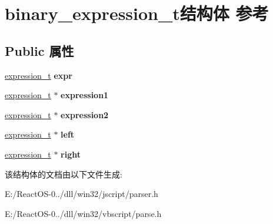\hypertarget{structbinary__expression__t}{}\section{binary\+\_\+expression\+\_\+t结构体 参考}
\label{structbinary__expression__t}
\subsection*{Public 属性}
\begin{DoxyCompactItemize}
\item 
\mbox{\label{structbinary__expression__t_a37b4bea766c22ebcfaf665cd6819bd66}} 
\hyperlink{struct__expression__t}{expression\+\_\+t} {\bfseries expr}
\item 
\mbox{\label{structbinary__expression__t_a7575e5584618b599ffcb671cf500068d}} 
\hyperlink{struct__expression__t}{expression\+\_\+t} $\ast$ {\bfseries expression1}
\item 
\mbox{\label{structbinary__expression__t_ade2a074801ab798f55ffe17bfb4d5f59}} 
\hyperlink{struct__expression__t}{expression\+\_\+t} $\ast$ {\bfseries expression2}
\item 
\mbox{\label{structbinary__expression__t_a068ad7e4fea53c4b6e3261a70338dd1a}} 
\hyperlink{struct__expression__t}{expression\+\_\+t} $\ast$ {\bfseries left}
\item 
\mbox{\label{structbinary__expression__t_af40a00f93863ff0973614dcc9078402f}} 
\hyperlink{struct__expression__t}{expression\+\_\+t} $\ast$ {\bfseries right}
\end{DoxyCompactItemize}


该结构体的文档由以下文件生成\+:\begin{DoxyCompactItemize}
\item 
E\+:/\+React\+O\+S-\/0../dll/win32/jscript/parser.\+h\item 
E\+:/\+React\+O\+S-\/0../dll/win32/vbscript/parse.\+h\end{DoxyCompactItemize}

